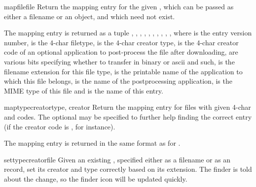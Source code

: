 \begin{funcdesc}{mapfile}{file}
Return the mapping entry for the given , which can be passed
as either a filename or an  object, and which need not
exist.

The mapping entry is returned as a tuple \code{(},
, , , ,
, , , ,
\code{)}, where  is the entry version
number,  is the 4-char filetype,  is the 4-char
creator type,  is the 4-char creator code of an
optional application to post-process the file after downloading,
 are various bits specifying whether to transfer in binary
or ascii and such,  is the filename extension for this
file type,  is the printable name of the application to
which this file belongs,  is the name of the
postprocessing application,  is the MIME type of this
file and  is the name of this entry.
\end{funcdesc}

\begin{funcdesc}{maptypecreator}{type, creator }
Return the mapping entry for files with given 4-char  and
 codes. The optional  may be specified to
further help finding the correct entry (if the creator code is
, for instance).

The mapping entry is returned in the same format as for .
\end{funcdesc}

\begin{funcdesc}{settypecreator}{file}
Given an existing , specified either as a filename or as an
 record, set its creator and type correctly based on its
extension. The finder is told about the change, so the finder icon
will be updated quickly.
\end{funcdesc}
